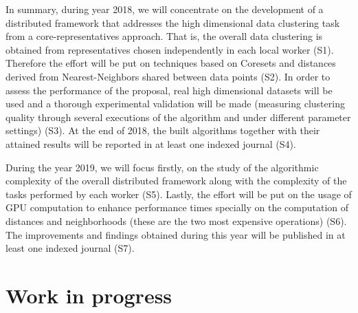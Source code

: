 \documentclass[10pt]{article}
\begin{document}
In summary, during year 2018, we will concentrate on the development of a distributed framework that addresses the high dimensional data clustering task from a core-representatives approach. That is, the overall data clustering is obtained from representatives chosen independently in each local worker (S1). Therefore the effort will be put on techniques based on Coresets and distances derived from Nearest-Neighbors shared between data points (S2).
In order to assess the performance of the proposal, real high dimensional datasets will be used and a thorough experimental validation will be made (measuring clustering quality through several executions of the algorithm and under different parameter settings) (S3).
At the end of 2018, the built algorithms together with their attained results will be reported in at least one indexed journal (S4).





During the year 2019, we will focus firstly, on the study of the algorithmic complexity of the overall distributed framework along with the complexity of the tasks performed by each worker (S5). 
Lastly, the effort will be put on the usage of GPU computation to enhance performance times specially on the computation of distances and neighborhoods (these are the two most expensive operations) (S6). 
The improvements and findings obtained during this year will be published in at least one indexed
journal (S7).


\section{Work in progress}
\end{document}
